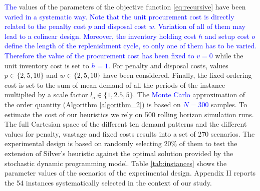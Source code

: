 \documentclass{tPRS2e}
\newcommand{\blue}{\textcolor{blue}}
\begin{document}
\blue{The} values of the parameters of the objective function \ref{eq:recursive} have been \blue{varied in a systematic way. Note that the unit procurement cost is directly related to the penalty cost $p$ and disposal cost $w$. Variation of all of them may lead to a colinear design. Moreover, the inventory holding cost $h$ and setup cost $o$ define the length of the replenishment cycle, so only one of them has to be varied. Therefore the value of the procurement cost has been fixed to $v=0$} while the unit inventory cost is set to \blue{$h=1$}. For penalty and disposal costs, values $p \in \{2,5,10\}$ and $w \in \{2,5,10\}$ have been considered. Finally, the fixed ordering cost is set to the sum of mean demand of all the periods of the instance multiplied by a scale factor $l_o \in \{1, 2.5, 5\}$. The \blue{Monte Carlo} approximation of the order quantity (Algorithm \ref{algorithm_2}) is based on \blue{$N=300$} samples. To estimate the cost of our heuristics we rely on 500 rolling horizon simulation runs. The full Cartesian space of the different ten demand patterns and the different values for penalty, wastage and fixed costs results into a set of 270 scenarios. The experimental design is based on randomly selecting 20\% of them to test the extension of Silver's heuristic against the optimal solution provided by the stochastic dynamic programming model. Table \ref{tab:instances} shows the parameter values of the scenarios of the experimental design. Appendix II reports the 54 instances systematically selected in the context of our study.
\end{document}

